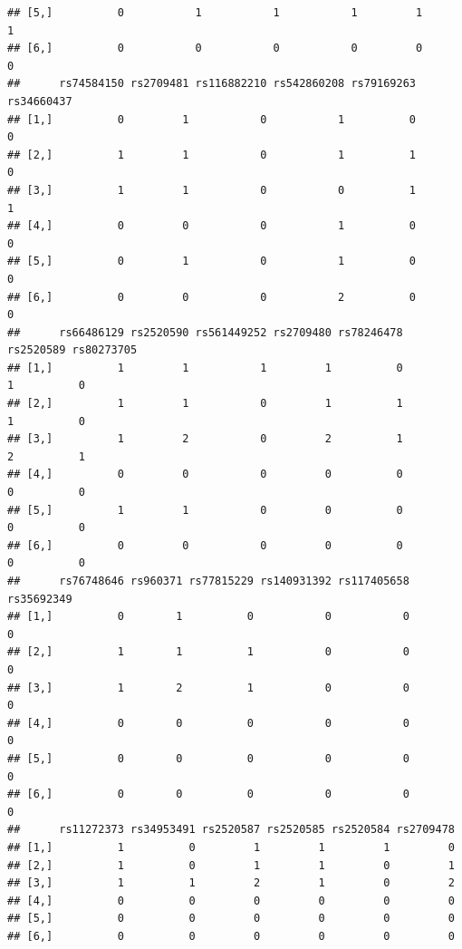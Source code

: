 \documentclass[
]{article}
\begin{document}
\begin{verbatim}
## [5,]          0           1           1           1         1         1
## [6,]          0           0           0           0         0         0
##      rs74584150 rs2709481 rs116882210 rs542860208 rs79169263 rs34660437
## [1,]          0         1           0           1          0          0
## [2,]          1         1           0           1          1          0
## [3,]          1         1           0           0          1          1
## [4,]          0         0           0           1          0          0
## [5,]          0         1           0           1          0          0
## [6,]          0         0           0           2          0          0
##      rs66486129 rs2520590 rs561449252 rs2709480 rs78246478 rs2520589 rs80273705
## [1,]          1         1           1         1          0         1          0
## [2,]          1         1           0         1          1         1          0
## [3,]          1         2           0         2          1         2          1
## [4,]          0         0           0         0          0         0          0
## [5,]          1         1           0         0          0         0          0
## [6,]          0         0           0         0          0         0          0
##      rs76748646 rs960371 rs77815229 rs140931392 rs117405658 rs35692349
## [1,]          0        1          0           0           0          0
## [2,]          1        1          1           0           0          0
## [3,]          1        2          1           0           0          0
## [4,]          0        0          0           0           0          0
## [5,]          0        0          0           0           0          0
## [6,]          0        0          0           0           0          0
##      rs11272373 rs34953491 rs2520587 rs2520585 rs2520584 rs2709478
## [1,]          1          0         1         1         1         0
## [2,]          1          0         1         1         0         1
## [3,]          1          1         2         1         0         2
## [4,]          0          0         0         0         0         0
## [5,]          0          0         0         0         0         0
## [6,]          0          0         0         0         0         0
\end{verbatim}
\end{document}
